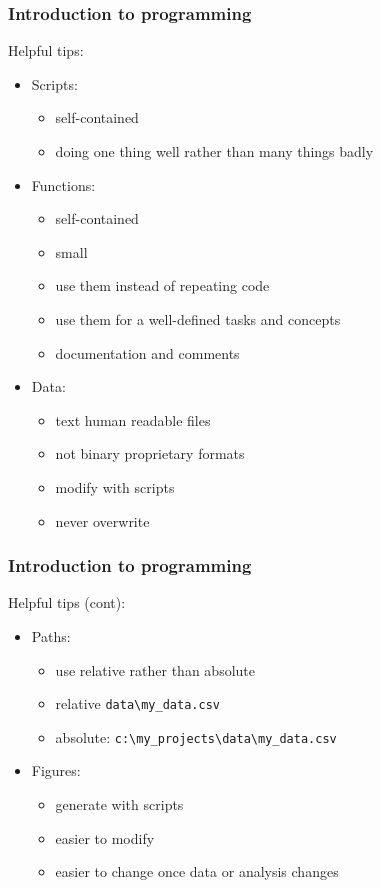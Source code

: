 \documentclass[xcolor=dvipsnames,xcolor=table, 14p]{beamer}
\newcommand{\code}[1]{\colorbox{codegray}{\texttt{#1}}}
\newcommand{\bs}{\textbackslash}
\begin{document}
\begin{frame}\frametitle{Introduction to programming}
Helpful tips:
\begin{itemize}
    \item Scripts:
    \begin{itemize}
        \item self-contained
        \item doing one thing well rather than many things badly
    \end{itemize}
    \item Functions:
    \begin{itemize}
        \item self-contained
        \item small
        \item use them instead of repeating code
        \item use them for a well-defined tasks and concepts
        \item documentation and comments
    \end{itemize}
    \item Data:
    \begin{itemize}
        \item text human readable files
        \item not binary proprietary formats
        \item modify with scripts
        \item never overwrite
    \end{itemize}
\end{itemize}
\end{frame}

\begin{frame}\frametitle{Introduction to programming}
Helpful tips (cont):
\begin{itemize}
    \item Paths:
    \begin{itemize}
        \item use relative rather than absolute
        \item relative \code{data\bs my\_data.csv}
        \item absolute: \code{c:\bs my\_projects\bs data\bs my\_data.csv}
    \end{itemize}
    \item Figures:
    \begin{itemize}
        \item generate with scripts
        \item easier to modify
        \item easier to change once data or analysis changes
    \end{itemize}
\end{itemize}
\end{frame}
\end{document}
